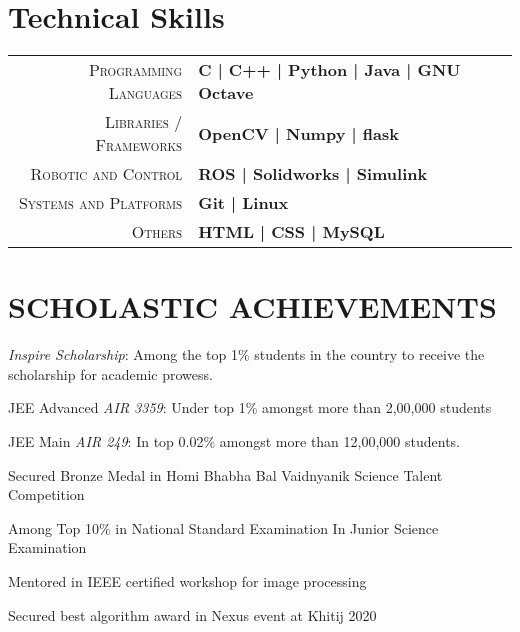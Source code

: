 \documentclass[]{deedy-resume-openfont}
\begin{document}
\begin{minipage}[t]{0.66\textwidth}
\begin{tightemize}
\end{tightemize}
\sectionsep


\section{Technical Skills}
\begin{tabular}{r|p{15cm}}
\textsc{Programming Languages} & \textbf{ C | C++ | Python | Java | GNU Octave} \\
\textsc{Libraries / Frameworks} & \textbf{OpenCV | Numpy | flask }\\
\textsc{Robotic and Control} & \textbf{ROS | Solidworks | Simulink }\\
\textsc{Systems and Platforms} & \textbf{Git | Linux }\\
\textsc{Others} & \textbf{HTML | CSS | MySQL }\\
\end{tabular}

\section{SCHOLASTIC ACHIEVEMENTS}

\vspace{\topsep} %
\begin{tightemize}

\item {\emph{Inspire Scholarship}:} Among the top 1\% students in the country to receive the scholarship for academic prowess. \\
\item{JEE Advanced \emph{AIR 3359}:} Under top 1\% amongst more than 2,00,000 students \\
\item {JEE Main \emph{AIR 249}:} In top 0.02\% amongst more than 12,00,000 students. \\
\item {Secured Bronze Medal in Homi Bhabha Bal Vaidnyanik Science Talent Competition}\\
\item {Among Top 10\% in National Standard Examination In Junior Science Examination}\\
\item {Mentored in IEEE certified workshop for image processing  }\\
\item {Secured best algorithm award in Nexus event at Khitij 2020}
\end{tightemize}
\sectionsep


\end{minipage} 
\end{document}
